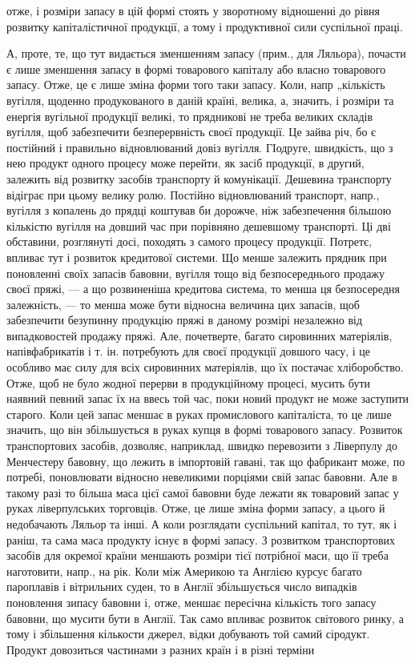 \parcont{}  %
отже, і розміри запасу в цій формі стоять у зворотному відношенні до
рівня розвитку капіталістичної продукції, а тому і продуктивної сили
суспільної праці.

А, проте, те, що тут видається зменшенням запасу (прим., для Ляльора),
почасти є лише зменшення запасу в формі товарового капіталу або
власно товарового запасу. Отже, це є лише зміна форми того таки запасу.
Коли, напр „кількість вугілля, щоденно продукованого в даній країні,
велика, а, значить, і розміри та енергія вугільної продукції великі, то
прядникові не треба великих складів вугілля, щоб забезпечити безперервність
своєї продукції. Це зайва річ, бо є постійний і правильно
відновлюваний довіз вугілля. ГІодруге, швидкість, що з нею продукт
одного процесу може перейти, як засіб продукції, в другий, залежить
від розвитку засобів транспорту й комунікації. Дешевина транспорту
відіграє при цьому велику ролю. Постійно відновлюваний транспорт,
напр., вугілля з копалень до прядці коштував би дорожче, ніж забезпечення
більшою кількістю вугілля на довший час при порівняно дешевшому
транспорті. Ці дві обставини, розглянуті досі, походять з самого процесу
продукції. Потретє, впливає тут і розвиток кредитової системи. Що менше
залежить прядник при поновленні своїх запасів бавовни, вугілля тощо від
безпосереднього продажу своєї пряжі, — а що розвиненіша кредитова система,
то менша ця безпосередня залежність, — то менша може бути відносна
величина цих запасів, щоб забезпечити безупинну продукцію пряжі
в даному розмірі незалежно від випадковостей продажу пряжі. Але,
почетверте, багато сировинних матеріялів, напівфабрикатів і т. ін. потребують
для своєї продукції довшого часу, і це особливо має силу для
всіх сировинних матеріялів, що їх постачає хліборобство. Отже, щоб не
було жодної перерви в продукційному процесі, мусить бути наявний
певний запас їх на ввесь той час, поки новий продукт не може заступити
старого. Коли цей запас меншає в руках промислового капіталіста,
то це лише значить, що він збільшується в руках купця в
формі товарового запасу. Розвиток транспортових засобів, дозволяє, наприклад,
швидко перевозити з Ліверпулу до Менчестеру бавовну, що
лежить в імпортовій гавані, так що фабрикант може, по потребі, поновлювати
відносно невеликими порціями свій запас бавовни. Але в такому
разі то більша маса цієї самої бавовни буде лежати як товаровий
запас у руках ліверпулських торговців. Отже, це лише зміна форми запасу,
а цього й недобачають Ляльор та інші. А коли розглядати суспільний
капітал, то тут, як і раніш, та сама маса продукту існує в формі
запасу. З розвитком транспортових засобів для окремої країни меншають
розміри тієї потрібної маси, що її треба наготовити, напр., на рік.
Коли між Америкою та Англією курсує багато пароплавів і вітрильних
суден, то в Англії збільшується число випадків поновлення зипасу бавовни
і, отже, меншає пересічна кількість того запасу бавовни, що мусити
бути в Англії. Так само впливає розвиток світового ринку, а
тому і збільшення кількости джерел, відки добувають той самий
сіродукт. Продукт довозиться частинами з разних країн і в різні терміни
\parbreak{}  %
